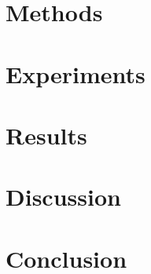 \documentclass[conference]{IEEEtran}
\begin{document}
\section{Methods}\label{section:methods}


\section{Experiments}\label{section:experiments}


\section{Results}\label{section:results}


\section{Discussion}\label{section:discussion}


\section{Conclusion}\label{section:conclusion}



\end{document}
